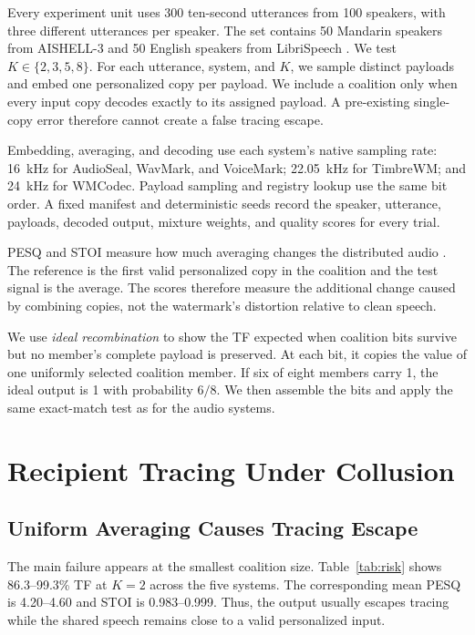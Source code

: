 \documentclass{article}
\begin{document}
Every experiment unit uses 300 ten-second utterances from 100 speakers, with three different utterances per speaker. The set contains 50 Mandarin speakers from AISHELL-3 and 50 English speakers from LibriSpeech \cite{shi2021aishell3,panayotov2015librispeech}. We test $K\in\{2,3,5,8\}$. For each utterance, system, and $K$, we sample distinct payloads and embed one personalized copy per payload. We include a coalition only when every input copy decodes exactly to its assigned payload. A pre-existing single-copy error therefore cannot create a false tracing escape.

Embedding, averaging, and decoding use each system's native sampling rate: 16~kHz for AudioSeal, WavMark, and VoiceMark; 22.05~kHz for TimbreWM; and 24~kHz for WMCodec. Payload sampling and registry lookup use the same bit order. A fixed manifest and deterministic seeds record the speaker, utterance, payloads, decoded output, mixture weights, and quality scores for every trial.

PESQ and STOI measure how much averaging changes the distributed audio \cite{rix2001pesq,taal2011stoi}. The reference is the first valid personalized copy in the coalition and the test signal is the average. The scores therefore measure the additional change caused by combining copies, not the watermark's distortion relative to clean speech.

We use \emph{ideal recombination} to show the TF expected when coalition bits survive but no member's complete payload is preserved. At each bit, it copies the value of one uniformly selected coalition member. If six of eight members carry 1, the ideal output is 1 with probability $6/8$. We then assemble the bits and apply the same exact-match test as for the audio systems.

\section{Recipient Tracing Under Collusion}
\label{sec:main_results}

\subsection{Uniform Averaging Causes Tracing Escape}

The main failure appears at the smallest coalition size. Table~\ref{tab:risk} shows 86.3--99.3\% TF at $K=2$ across the five systems. The corresponding mean PESQ is 4.20--4.60 and STOI is 0.983--0.999. Thus, the output usually escapes tracing while the shared speech remains close to a valid personalized input.
\end{document}
